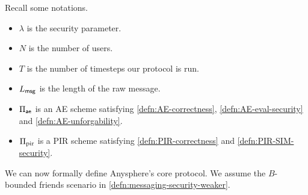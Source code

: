 Recall some notations.
\begin{itemize}
    \item $\lambda$ is the security parameter.
    \item $N$ is the number of users.
    \item $T$ is the number of timesteps our protocol is run.
    \item $L_{\mathsf{msg}}$ is the length of the raw message.
    \item $\Pi_{\mathsf{ae}}$ is an AE scheme satisfying \cref{defn:AE-correctness}, \cref{defn:AE-eval-security} and \cref{defn:AE-unforgability}.
    \item $\Pi_{\text{pir}}$ is a PIR scheme satisfying \cref{defn:PIR-correctness} and \cref{defn:PIR-SIM-security}.
\end{itemize}
We can now formally define Anysphere's core protocol. We assume the $B$-bounded friends scenario in \cref{defn:messaging-security-weaker}.
